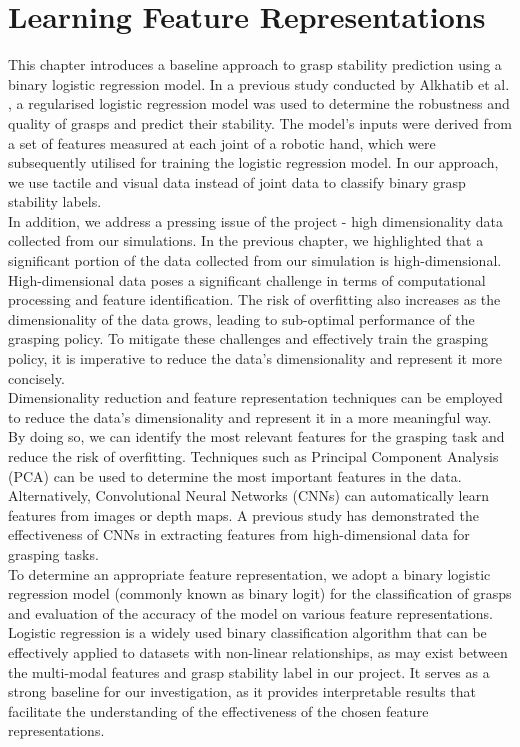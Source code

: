 \documentclass[11pt, a4paper]{report}
\begin{document}
\chapter{Learning Feature Representations}
\label{chap:4}
This chapter introduces a baseline approach to grasp stability prediction using a binary logistic regression model. In a previous study conducted by Alkhatib et al. \cite{9091340}, a regularised logistic regression model was used to determine the robustness and quality of grasps and predict their stability. The model's inputs were derived from a set of features measured at each joint of a robotic hand, which were subsequently utilised for training the logistic regression model. In our approach, we use tactile and visual data instead of joint data to classify binary grasp stability labels.\\

In addition, we address a pressing issue of the project - high dimensionality data collected from our simulations. In the previous chapter, we highlighted that a significant portion of the data collected from our simulation is high-dimensional. High-dimensional data poses a significant challenge in terms of computational processing and feature identification. The risk of overfitting also increases as the dimensionality of the data grows, leading to sub-optimal performance of the grasping policy. To mitigate these challenges and effectively train the grasping policy, it is imperative to reduce the data's dimensionality and represent it more concisely.\\

Dimensionality reduction and feature representation techniques can be employed to reduce the data's dimensionality and represent it in a more meaningful way. By doing so, we can identify the most relevant features for the grasping task and reduce the risk of overfitting. Techniques such as Principal Component Analysis (PCA) can be used to determine the most important features in the data. Alternatively, Convolutional Neural Networks (CNNs) can automatically learn features from images or depth maps. A previous study \cite{Calandra_2018} has demonstrated the effectiveness of CNNs in extracting features from high-dimensional data for grasping tasks.\\

To determine an appropriate feature representation, we adopt a binary logistic regression model (commonly known as binary logit) for the classification of grasps and evaluation of the accuracy of the model on various feature representations. Logistic regression is a widely used binary classification algorithm that can be effectively applied to datasets with non-linear relationships, as may exist between the multi-modal features and grasp stability label in our project. It serves as a strong baseline for our investigation, as it provides interpretable results that facilitate the understanding of the effectiveness of the chosen feature representations.\\
\end{document}
